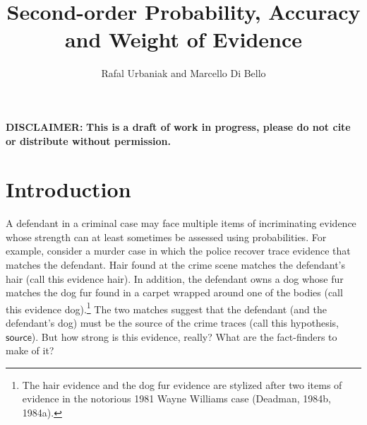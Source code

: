 \documentclass[
  10pt,
  dvipsnames,enabledeprecatedfontcommands]{scrartcl}
\title{Second-order Probability, Accuracy and Weight of Evidence}
\author{Rafal Urbaniak and Marcello Di Bello}
\date{}
\begin{document}
\maketitle

{
\hypersetup{linkcolor=}
\setcounter{tocdepth}{2}
\tableofcontents
}
\vspace{2cm}

\noindent \textbf{DISCLAIMER:}
\textbf{This is a draft of work in progress, please do not cite or distribute without permission.}

\thispagestyle{empty}

\newpage

\hypertarget{introduction}{%
\section{Introduction}\label{introduction}}

A defendant in a criminal case may face multiple items of incriminating
evidence whose strength can at least sometimes be assessed using
probabilities. For example, consider a murder case in which the police
recover trace evidence that matches the defendant. Hair found at the
crime scene matches the defendant's hair (call this evidence
\textsf{hair}). In addition, the defendant owns a dog whose fur matches
the dog fur found in a carpet wrapped around one of the bodies (call
this evidence \textsf{dog}).\footnote{The hair evidence and the dog fur
  evidence are stylized after two items of evidence in the notorious
  1981 Wayne Williams case (Deadman, 1984b, 1984a).} The two matches
suggest that the defendant (and the defendant's dog) must be the source
of the crime traces (call this hypothesis, \(\mathsf{source}\)). But how
strong is this evidence, really? What are the fact-finders to make of
it?
\end{document}
